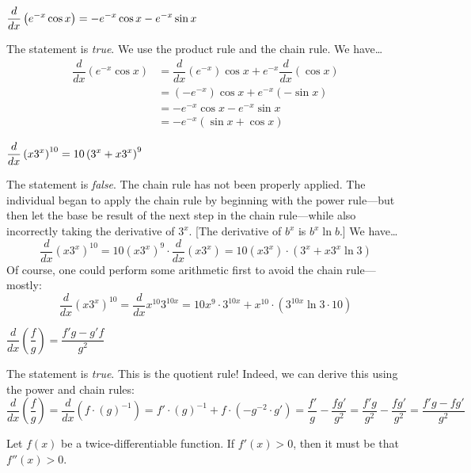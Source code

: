 \documentclass[11pt,letterpaper]{article}
\begin{document}
 $\displaystyle \dfrac{d}{dx} \left( e^{-x} \cos x \right)= -e^{-x} \cos x - e^{-x} \sin x$ \pspace

\sol The statement is \textit{true}. We use the product rule and the chain rule. We have\dots
	\[
	\begin{aligned}
	\dfrac{d}{dx} \left( e^{-x} \cos x \right)&= \dfrac{d}{dx} (e^{-x}) \cos x + e^{-x} \dfrac{d}{dx} ( \cos x) \\[0.3cm]
	&= (-e^{-x}) \cos x + e^{-x} (-\sin x) \\[0.3cm]
	&= -e^{-x} \cos x - e^{-x} \sin x \\[0.3cm]
	&= -e^{-x} (\sin x + \cos x)
	\end{aligned}
	\] \pvspace{1cm}



 $\displaystyle \dfrac{d}{dx} \left(x 3^x \right)^{10}= 10 \left(3^x + x3^x \right)^9$ \pspace

\sol The statement is \textit{false}. The chain rule has not been properly applied. The individual began to apply the chain rule by beginning with the power rule---but then let the base be result of the next step in the chain rule---while also incorrectly taking the derivative of $3^x$. [The derivative of $b^x$ is $b^x \ln b$.] We have\dots
	\[
	\dfrac{d}{dx} \left(x 3^x \right)^{10}= 10 \left(x 3^x \right)^9 \cdot \dfrac{d}{dx} \left(x 3^x \right)= 10(x3^x) \cdot (3^x + x 3^x \ln 3)
	\]
Of course, one could perform some arithmetic first to avoid the chain rule---mostly:
	\[
	\dfrac{d}{dx} \left(x 3^x \right)^{10}= \dfrac{d}{dx} x^10 3^{10x}= 10x^9 \cdot 3^{10x} + x^{10} \cdot \left( 3^{10x} \ln 3 \cdot 10 \right)
	\] \pvspace{1.3cm}



 $\dfrac{d}{dx} \left( \dfrac{f}{g} \right)= \dfrac{f' g - g' f}{g^2}$ \pspace

\sol The statement is \textit{true}. This is the quotient rule! Indeed, we can derive this using the power and chain rules:
	\[
	\dfrac{d}{dx} \left( \dfrac{f}{g} \right)= \dfrac{d}{dx} \left( f \cdot (g)^{-1} \right)= f' \cdot (g)^{-1} + f \cdot (- g^{-2} \cdot g')= \dfrac{f'}{g} - \dfrac{fg'}{g^2}= \dfrac{f' g}{g^2} - \dfrac{f g'}{g^2}= \dfrac{f' g - f g'}{g^2}
	\] \pvspace{1.3cm}



 Let $f(x)$ be a twice-differentiable function. If $f'(x) > 0$, then it must be that $f''(x) > 0$. \pspace
\end{document}
